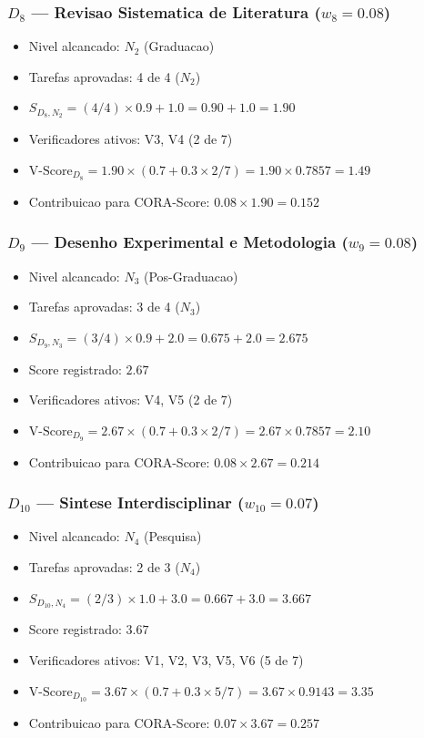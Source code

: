 \subsubsection{$D_8$ --- Revisao Sistematica de Literatura ($w_{8}=0.08$)}

\begin{itemize}
\item Nivel alcancado: $N_2$ (Graduacao)
\item Tarefas aprovadas: 4 de 4 ($N_2$)
\item $S_{D_8,N_2} = (4/4) \times 0.9 + 1.0 = 0.90 + 1.0 = 1.90$
\item Verificadores ativos: V3, V4 (2 de 7)
\item $\text{V-Score}_{D_8} = 1.90 \times (0.7 + 0.3 \times 2/7) = 1.90 \times 0.7857 = 1.49$
\item Contribuicao para CORA-Score: $0.08 \times 1.90 = 0.152$
\end{itemize}

\subsubsection{$D_9$ --- Desenho Experimental e Metodologia ($w_{9}=0.08$)}

\begin{itemize}
\item Nivel alcancado: $N_3$ (Pos-Graduacao)
\item Tarefas aprovadas: 3 de 4 ($N_3$)
\item $S_{D_9,N_3} = (3/4) \times 0.9 + 2.0 = 0.675 + 2.0 = 2.675$
\item Score registrado: $2.67$
\item Verificadores ativos: V4, V5 (2 de 7)
\item $\text{V-Score}_{D_9} = 2.67 \times (0.7 + 0.3 \times 2/7) = 2.67 \times 0.7857 = 2.10$
\item Contribuicao para CORA-Score: $0.08 \times 2.67 = 0.214$
\end{itemize}

\subsubsection{$D_{10}$ --- Sintese Interdisciplinar ($w_{10}=0.07$)}

\begin{itemize}
\item Nivel alcancado: $N_4$ (Pesquisa)
\item Tarefas aprovadas: 2 de 3 ($N_4$)
\item $S_{D_{10},N_4} = (2/3) \times 1.0 + 3.0 = 0.667 + 3.0 = 3.667$
\item Score registrado: $3.67$
\item Verificadores ativos: V1, V2, V3, V5, V6 (5 de 7)
\item $\text{V-Score}_{D_{10}} = 3.67 \times (0.7 + 0.3 \times 5/7) = 3.67 \times 0.9143 = 3.35$
\item Contribuicao para CORA-Score: $0.07 \times 3.67 = 0.257$
\end{itemize}

